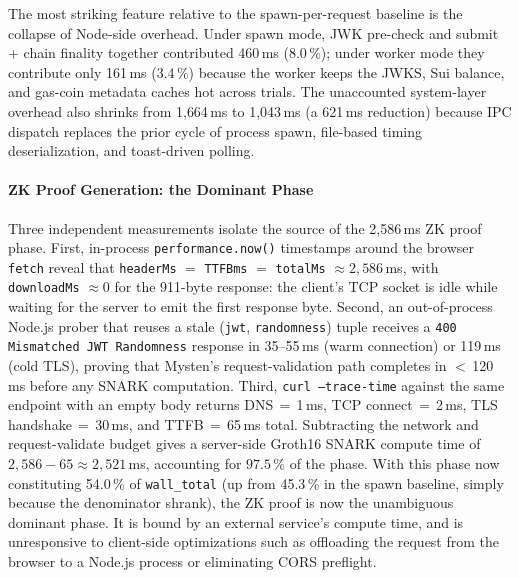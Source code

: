 \noindent
The most striking feature relative to the spawn-per-request baseline is
the collapse of Node-side overhead. Under spawn mode, JWK pre-check and
submit + chain finality together contributed 460\,ms (8.0\,\%); under
worker mode they contribute only 161\,ms (3.4\,\%) because the worker
keeps the JWKS, Sui balance, and gas-coin metadata caches hot across
trials. The unaccounted system-layer overhead also shrinks from
1{,}664\,ms to 1{,}043\,ms (a 621\,ms reduction) because IPC dispatch
replaces the prior cycle of process spawn, file-based timing
deserialization, and toast-driven polling.

\paragraph{ZK Proof Generation: the Dominant Phase}

Three independent measurements isolate the source of the 2{,}586\,ms ZK
proof phase. First, in-process \texttt{performance.now()} timestamps
around the browser \texttt{fetch} reveal that
\texttt{headerMs} $=$ \texttt{TTFBms} $=$ \texttt{totalMs} $\approx 2{,}586$\,ms,
with \texttt{downloadMs} $\approx 0$ for the 911-byte response: the
client's TCP socket is idle while waiting for the server to emit the
first response byte. Second, an out-of-process Node.js prober that
reuses a stale (\texttt{jwt}, \texttt{randomness}) tuple receives a
\texttt{400 Mismatched JWT Randomness} response in 35--55\,ms (warm
connection) or 119\,ms (cold TLS), proving that Mysten's
request-validation path completes in $<\,$120\,ms before any SNARK
computation. Third, \texttt{curl --trace-time} against the same endpoint
with an empty body returns DNS\,$=$\,1\,ms, TCP connect\,$=$\,2\,ms,
TLS handshake\,$=$\,30\,ms, and TTFB\,$=$\,65\,ms total. Subtracting the
network and request-validate budget gives a server-side Groth16 SNARK
compute time of \(2{,}586 - 65 \approx 2{,}521\)\,ms, accounting for
$97.5\,\%$ of the phase. With this phase now constituting 54.0\,\% of
\texttt{wall\_total} (up from 45.3\,\% in the spawn baseline, simply
because the denominator shrank), the ZK proof is now the unambiguous
dominant phase. It is bound by an external service's compute time, and
is unresponsive to client-side optimizations such as offloading the
request from the browser to a Node.js process or eliminating CORS
preflight.

